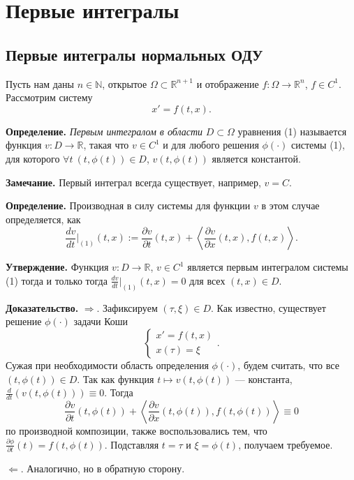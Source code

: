 \setcounter{equation}{0}
\section{Первые интегралы}
\subsection{Первые интегралы нормальных ОДУ}
Пусть нам даны $n \in \mathbb N$, открытое $\Omega \subset \mathbb R^{n+1}$ и отображение $f: \Omega \to \mathbb R^n$, $f \in C^1$.
Рассмотрим систему
\begin{equation}
    x' = f(t, x).
\end{equation}

\textbf{Определение.} \textit{Первым интегралом в области} $D \subset \Omega$ уравнения (1) называется функция $v: D \to \mathbb R$, такая что $v \in C^1$ и для любого решения $\phi(\cdot)$ системы (1), для которого $\forall t~(t, \phi(t)) \in D$, $v(t, \phi(t))$ является константой.

\textbf{Замечание.} Первый интеграл всегда существует, например, $v = C$.

\textbf{Определение.} Производная в силу системы для функции $v$ в этом случае определяется, как
\[
    \frac{dv}{dt} \bigg|_{(1)}(t, x) := \frac{\partial v}{\partial t}(t, x) + \left< \frac{\partial v}{\partial x} (t, x), f(t, x) \right>.
\]

\textbf{Утверждение.} Функция $v: D \to \mathbb R$, $v \in C^1$ является первым интегралом системы (1) тогда и только тогда $\frac{dv}{dt} \big|_{(1)}(t, x) = 0$ для всех $(t, x) \in D$.

\textbf{Доказательство.} $\Rightarrow$. Зафиксируем $(\tau, \xi) \in D$. 
Как известно, существует решение $\phi(\cdot)$ задачи Коши
\[
    \begin{cases}
        x' = f(t, x) \\
        x(\tau) = \xi
    \end{cases} .
\]
Сужая при необходимости область определения $\phi(\cdot)$, будем считать, что все $(t, \phi(t)) \in D$.
Так как функция $t \mapsto v(t, \phi(t))$ --- константа, $\frac{d}{dt}(v(t, \phi(t))) \equiv 0$.
Тогда
\[
    \frac{\partial v}{\partial t}(t, \phi(t)) + \left< \frac{\partial v}{\partial x}(t, \phi(t)), f(t, \phi(t)) \right> \equiv 0
\]
по производной композиции, также воспользовались тем, что $\frac{\partial \phi}{\partial t}(t) = f(t, \phi(t))$.
Подставляя $t = \tau$ и $\xi = \phi(t)$, получаем требуемое.

$\Leftarrow$. Аналогично, но в обратную сторону.

